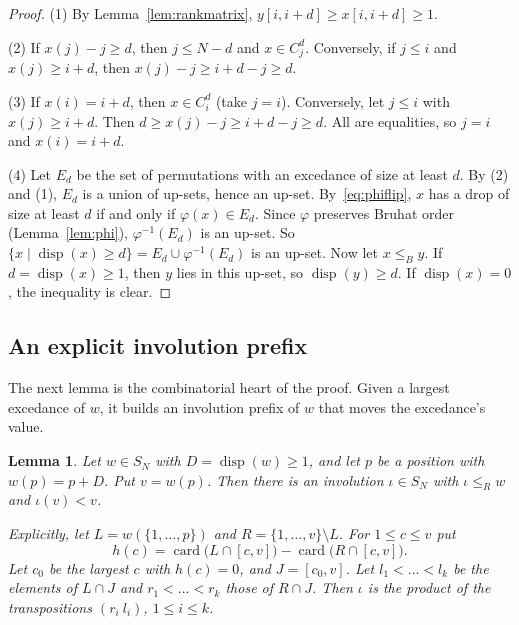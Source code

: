 \documentclass[11pt]{amsart}
\newtheorem{lemma}[theorem]{Lemma}
\theoremstyle{definition}
\theoremstyle{remark}
\numberwithin{equation}{section}
\newcommand{\leR}{\le_R}
\newcommand{\leB}{\le_B}
\DeclareMathOperator{\disp}{disp}
\DeclareMathOperator{\card}{card}
\begin{document}
\begin{proof}
(1) By Lemma~\ref{lem:rankmatrix}, \(y[i,i+d]\ge x[i,i+d]\ge1\).

(2) If \(x(j)-j\ge d\), then \(j\le N-d\) and \(x\in C_j^d\). Conversely, if \(j\le i\) and \(x(j)\ge i+d\), then \(x(j)-j\ge i+d-j\ge d\).

(3) If \(x(i)=i+d\), then \(x\in C_i^d\) (take \(j=i\)). Conversely, let \(j\le i\) with \(x(j)\ge i+d\). Then \(d\ge x(j)-j\ge i+d-j\ge d\). All are equalities, so \(j=i\) and \(x(i)=i+d\).

(4) Let \(E_d\) be the set of permutations with an excedance of size at least \(d\). By (2) and (1), \(E_d\) is a union of up-sets, hence an up-set. By~\eqref{eq:phiflip}, \(x\) has a drop of size at least \(d\) if and only if \(\varphi(x)\in E_d\). Since \(\varphi\) preserves Bruhat order (Lemma~\ref{lem:phi}), \(\varphi^{-1}(E_d)\) is an up-set. So \(\{x\mid\disp(x)\ge d\}=E_d\cup\varphi^{-1}(E_d)\) is an up-set. Now let \(x\leB y\). If \(d=\disp(x)\ge1\), then \(y\) lies in this up-set, so \(\disp(y)\ge d\). If \(\disp(x)=0\), the inequality is clear.
\end{proof}

\subsection{An explicit involution prefix}
The next lemma is the combinatorial heart of the proof. Given a largest excedance of \(w\), it builds an involution prefix of \(w\) that moves the excedance's value.

\begin{lemma}\label{lem:K}
Let \(w\in S_N\) with \(D=\disp(w)\ge1\), and let \(p\) be a position with \(w(p)=p+D\). Put \(v=w(p)\). Then there is an involution \(\iota\in S_N\) with \(\iota\leR w\) and \(\iota(v)<v\).

Explicitly, let \(L=w(\{1,\dots,p\})\) and \(R=\{1,\dots,v\}\setminus L\). For \(1\le c\le v\) put
\begin{equation}\label{eq:h}
h(c)=\card\bigl(L\cap[c,v]\bigr)-\card\bigl(R\cap[c,v]\bigr).
\end{equation}
Let \(c_0\) be the largest \(c\) with \(h(c)=0\), and \(J=[c_0,v]\). Let \(l_1<\dots<l_k\) be the elements of \(L\cap J\) and \(r_1<\dots<r_k\) those of \(R\cap J\). Then \(\iota\) is the product of the transpositions \((r_i\ l_i)\), \(1\le i\le k\).
\end{lemma}
\end{document}
